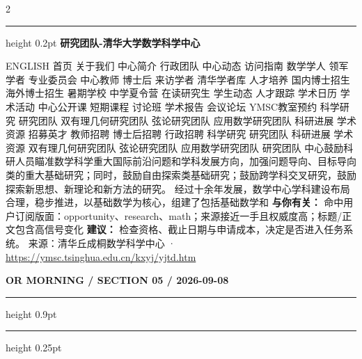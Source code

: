 \documentclass[10.5pt]{ctexart}
\begin{document}
\begin{multicols}{2}
\vspace{2mm}
\hrule height 0.2pt
\vspace{2mm}
{\large\bfseries 研究团队-清华大学数学科学中心}\par
ENGLISH 首页 关于我们 中心简介 行政团队 中心动态 访问指南 数学学人 领军学者 专业委员会 中心教师 博士后 来访学者 清华学者库 人才培养 国内博士招生 海外博士招生 暑期学校 中学夏令营 在读研究生 学生动态 人才跟踪 学术日历 学术活动 中心公开课 短期课程 讨论班 学术报告 会议论坛 YMSC教室预约 科学研究 研究团队 双有理几何研究团队 弦论研究团队 应用数学研究团队 科研进展 学术资源 招募英才 教师招聘 博士后招聘 行政招聘 科学研究 研究团队 科研进展 学术资源 双有理几何研究团队 弦论研究团队 应用数学研究团队 研究团队 中心鼓励科研人员瞄准数学科学重大国际前沿问题和学科发展方向，加强问题导向、目标导向类的重大基础研究；同时，鼓励自由探索类基础研究；鼓励跨学科交叉研究，鼓励探索新思想、新理论和新方法的研究。 经过十余年发展，数学中心学科建设布局合理，稳步推进，以基础数学为核心，组建了包括基础数学和
\textbf{与你有关：} 命中用户订阅版面：opportunity、research、math；来源接近一手且权威度高；标题/正文包含高信号变化
\textbf{建议：} 检查资格、截止日期与申请成本，决定是否进入任务系统。
{\footnotesize\color{ormuted} 来源：清华丘成桐数学科学中心 · \url{https://ymsc.tsinghua.edu.cn/kxyj/yjtd.htm}}
\end{multicols}
\newpage
{\small\bfseries OR MORNING / SECTION 05 / 2026-09-08}
\vspace{2mm}
\hrule height 0.9pt
\vspace{1.5mm}
\hrule height 0.25pt
\vspace{4mm}
\end{document}
